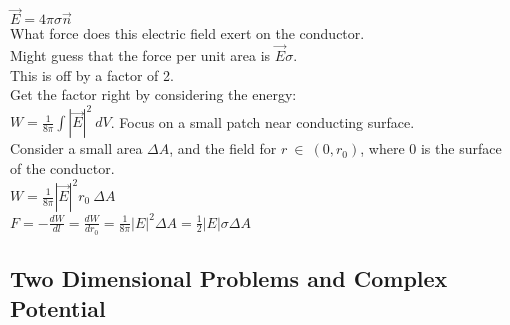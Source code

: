 \documentclass[a4paper,11pt]{article}
\begin{document}
$\vec{E}=4\pi\sigma \vec{n}$\\
What force does this electric field exert on the conductor.\\
Might guess that the force per unit area is $\vec{E}\sigma$.\\
This is off by a factor of 2.\\
Get the factor right by considering the energy:\\
$W=\frac{1}{8\pi}\int|\vec{E}|^2~dV$. Focus on a small patch near conducting surface.\\
Consider a small area $\Delta A$, and the field for $r~\in~(0,r_0)$, where $0$ is the surface of the conductor.\\
$W=\frac{1}{8\pi}|\vec{E}|^2r_0~\Delta A$\\
$F=-\frac{dW}{dl}=\frac{dW}{dr_0}=\frac{1}{8\pi}|E|^2\Delta A=\frac{1}{2}|E|\sigma\Delta A$

\subsection{Two Dimensional Problems and Complex Potential}
\end{document}
